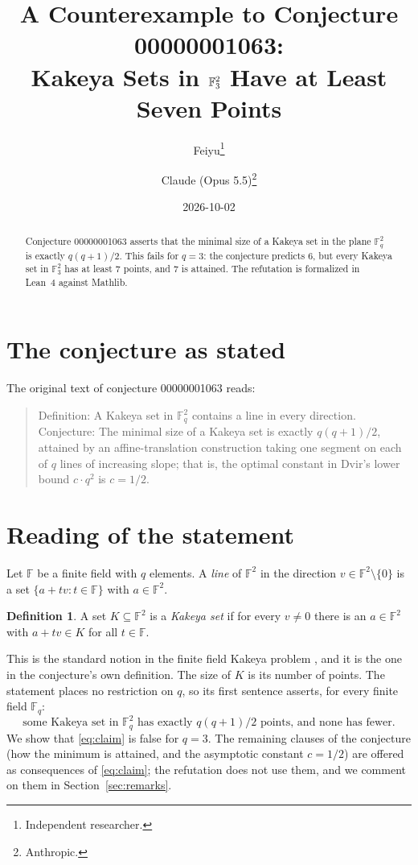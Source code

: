 \documentclass[11pt]{article}
\title{A Counterexample to Conjecture 00000001063:\\
Kakeya Sets in $\F_3^2$ Have at Least Seven Points}
\author{%
  Feiyu\thanks{Independent researcher.}
  \and
  Claude (Opus 5.5)\thanks{Anthropic.}%
}
\date{2026-10-02}
\theoremstyle{plain}
\theoremstyle{definition}
\newtheorem{definition}[theorem]{Definition}
\theoremstyle{remark}
\newcommand{\F}{\mathbb F}
\begin{document}
\maketitle

\begin{abstract}
Conjecture 00000001063 asserts that the minimal size of a Kakeya set in the
plane $\F_q^2$ is exactly $q(q+1)/2$. This fails for $q=3$: the conjecture
predicts $6$, but every Kakeya set in $\F_3^2$ has at least $7$ points, and $7$
is attained. The refutation is formalized in Lean~4 against Mathlib.
\end{abstract}

\section{The conjecture as stated}

The original text of conjecture 00000001063 reads:

\begin{quote}
Definition: A Kakeya set in $\F_q^2$ contains a line in every direction.
Conjecture: The minimal size of a Kakeya set is exactly $q(q+1)/2$, attained by
an affine-translation construction taking one segment on each of $q$ lines of
increasing slope; that is, the optimal constant in Dvir's lower bound $c\cdot
q^2$ is $c = 1/2$.
\end{quote}

\section{Reading of the statement}

Let $\F$ be a finite field with $q$ elements. A \emph{line} of $\F^2$ in the
direction $v\in\F^2\setminus\{0\}$ is a set $\{a+tv : t\in\F\}$ with
$a\in\F^2$.

\begin{definition}
A set $K\subseteq\F^2$ is a \emph{Kakeya set} if for every $v\ne0$ there is an
$a\in\F^2$ with $a+tv\in K$ for all $t\in\F$.
\end{definition}

This is the standard notion in the finite field Kakeya problem
\cite{dvir,bm}, and it is the one in the conjecture's own definition. The size
of $K$ is its number of points. The statement places no restriction on $q$, so
its first sentence asserts, for every finite field $\F_q$:
\begin{equation}\label{eq:claim}
  \text{some Kakeya set in }\F_q^2\text{ has exactly }q(q+1)/2\text{ points,
  and none has fewer.}
\end{equation}
We show that \eqref{eq:claim} is false for $q=3$. The remaining clauses of the
conjecture (how the minimum is attained, and the asymptotic constant $c=1/2$)
are offered as consequences of \eqref{eq:claim}; the refutation does not use
them, and we comment on them in Section~\ref{sec:remarks}.
\end{document}
